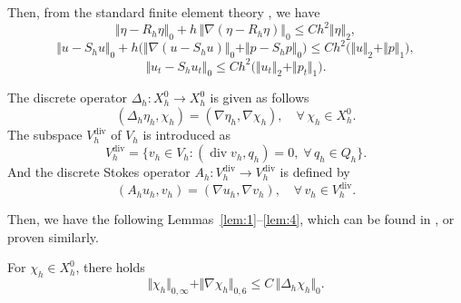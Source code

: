 Then, from the standard finite element theory \cite{John2016,Li2021}, we have
\begin{equation}
  \Vert\eta - R_{h}\eta\Vert_{0}
  + h\,\Vert\nabla(\eta-R_{h}\eta)\Vert_{0}
  \le Ch^{2}\Vert\eta\Vert_{2},
  \label{eq:Ritz-est}
\end{equation}
\begin{equation}
  \Vert u-S_{h}u\Vert_{0}
  + h\bigl(\Vert\nabla(u-S_{h}u)\Vert_{0}
    + \Vert p-S_{h}p\Vert_{0}\bigr)
  \le Ch^{2}\bigl(\Vert u\Vert_{2}+\Vert p\Vert_{1}\bigr),
  \label{eq:Stokes-est}
\end{equation}
\begin{equation}
  \Vert u_{t} - S_{h}u_{t}\Vert_{0}
  \le Ch^{2}\bigl(\Vert u_{t}\Vert_{2}+\Vert p_{t}\Vert_{1}\bigr).
  \label{eq:Stokes-t-est}
\end{equation}

The discrete operator $\Delta_{h}:X^{0}_{h}\to X^{0}_{h}$ is given as follows
\begin{equation}
  (\Delta_{h}\eta_{h},\chi_{h})
  = (\nabla\eta_{h},\nabla\chi_{h}),
  \quad \forall\,\chi_{h}\in X^{0}_{h}.
  \label{eq:Deltah}
\end{equation}
The subspace $V_{h}^{\mathrm{div}}$ of $V_{h}$ is introduced as
\begin{equation}
  V_{h}^{\mathrm{div}}
  = \bigl\{v_{h}\in V_{h} :
    (\operatorname{div}v_{h},q_{h})=0,\;\forall\,q_{h}\in Q_{h}\bigr\}.
  \label{eq:Vhdiv}
\end{equation}
And the discrete Stokes operator $A_{h}:V_{h}^{\mathrm{div}}\to V_{h}^{\mathrm{div}}$
is defined by
\begin{equation}
  (A_{h}u_{h},v_{h}) = (\nabla u_{h},\nabla v_{h}),
  \quad \forall\,v_{h}\in V_{h}^{\mathrm{div}}.
  \label{eq:Ah}
\end{equation}

Then, we have the following Lemmas~\ref{lem:1}--\ref{lem:4}, which can be
found in \cite{Liu2017ch,Diegel2017,Heywood1982,Heywood1990}, or proven
similarly.

\begin{lemma}
  \label{lem:1}
  For $\chi_{h}\in X^{0}_{h}$, there holds
  \begin{equation}
    \Vert\chi_{h}\Vert_{0,\infty}
    + \Vert\nabla\chi_{h}\Vert_{0,6}
    \le C\,\Vert\Delta_{h}\chi_{h}\Vert_{0}.
    \label{eq:lem1}
  \end{equation}
\end{lemma}

